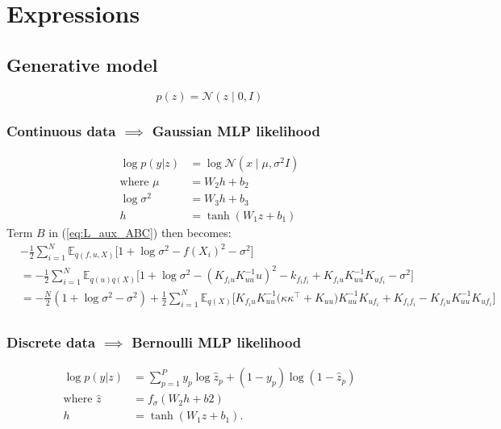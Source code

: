 \documentclass[12pt]{article}
\begin{document}
\section{Expressions}
\subsection{Generative model}
%
\begin{equation}
    p(z) = \mathcal{N}(z\mid 0, I)
\end{equation}
%
\subsubsection{Continuous data $\implies$ Gaussian MLP likelihood}
%
\begin{align}
    \log p(y|z) &= \log\mathcal{N}(x\mid \mu, \sigma^2 I)\\
    \text{where } \mu &= W_2 h + b_2\\
    \log\sigma^2 &= W_3 h + b_3\\
    h &= \tanh(W_1 z + b_1)
\end{align}
Term $B$ in (\ref{eq:L_aux_ABC}) then becomes:
%
\begin{align}
    &-\frac{1}{2}\sum_{i=1}^N \mathbb{E}_{q(f,u,X)}\big[ 1 + \log\sigma^2 - f(X_i)^2 - \sigma^2 \big]\\
    &= -\frac{1}{2}\sum_{i=1}^N \mathbb{E}_{q(u)q(X)}\big[ 1 + \log\sigma^2 - (K_{f_iu}K_{uu}^{-1}u)^2 - k_{f_if_i} + K_{f_iu}K_{uu}^{-1}K_{uf_i}-\sigma^2 \big]\\
    &= -\frac{N}{2}(1 + \log\sigma^2 - \sigma^2) + \frac{1}{2}\sum_{i=1}^N\mathbb{E}_{q(X)}\big[ K_{f_iu}K_{uu}^{-1}\big( \kappa\kappa^\top + K_{uu} \big)K_{uu}^{-1}K_{uf_i} + K_{f_if_i} - K_{f_iu}K_{uu}^{-1}K_{uf_i} \big]\\
\end{align}
%
%
\subsubsection{Discrete data $\implies$ Bernoulli MLP likelihood}
%
\begin{align}
    \log p(y|z) &= \sum_{p=1}^P y_p\log \hat{z}_p + (1-y_p)\log (1-\hat{z}_p)\\
    \text{where } \hat{z} &= f_\sigma(W_2 h + b2)\\
     h &= \tanh(W_1 z + b_1).
\end{align}
\end{document}
